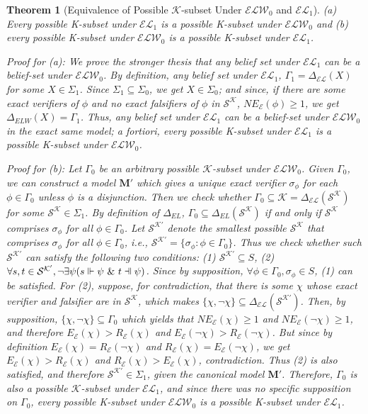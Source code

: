 \documentclass[12pt]{article}
\newtheorem{theorem}{Theorem}[section]
\newcommand{\fal}{\mathrel{\text{\reflectbox{$\Vdash$}}}}
\newcommand{\ver}{\Vdash}
\newcommand{\K}{\mathcal{K}}
\newcommand{\SK}{\mathcal{S}^\mathcal{K}}
\begin{document}
\begin{theorem}[Equivalence of Possible $\K$-subset Under $\mathcal{ELW}_{0}$ and $\mathcal{EL}_{1}$]
(a) Every possible K-subset under $\mathcal{EL}_{1}$ is a possible K-subset under $\mathcal{ELW}_{0}$ and (b) every possible K-subset under $\mathcal{ELW}_{0}$ is a possible K-subset under $\mathcal{EL}_{1}$.
\par
Proof for (a): We prove the stronger thesis that any belief set under $\mathcal{EL}_{1}$ can be a belief-set under $\mathcal{ELW}_0$. By definition, any belief set under $\mathcal{EL}_1$, $\Gamma_1 = \Delta_\mathcal{EL}(X)$ for some $X \in \Sigma_1$. Since $\Sigma_1 \subseteq \Sigma_0$, we get $X \in \Sigma_0$; and since, if there are some exact verifiers of $\phi$ and no exact falsifiers of $\phi$ in $\SK$, $NE_\mathcal{E}(\phi) \geq 1$, we get $\Delta_{ELW}(X) = \Gamma_1$. Thus, any belief set under $\mathcal{EL}_{1}$ can be a belief-set under $\mathcal{ELW}_0$ in the exact same model; a fortiori, every possible K-subset under $\mathcal{EL}_{1}$ is a possible K-subset under $\mathcal{ELW}_{0}$.
\par
Proof for (b): Let $\Gamma_0$ be an arbitrary possible $\K$-subset under $\mathcal{ELW}_0$. Given $\Gamma_0$, we can construct a model $\bm{M}'$ which gives a unique exact verifier $\sigma_\phi$ for each $\phi \in \Gamma_0$ unless $\phi$ is a disjunction. Then we check whether $\Gamma_0 \subseteq \K = \Delta_\mathcal{EL} (\SK)$ for some $\SK \in \Sigma_1$. By definition of $\Delta_{EL}$, $\Gamma_0 \subseteq \Delta_{EL} (\SK)$ if and only if $\SK$ comprises $\sigma_\phi$ for all $\phi \in \Gamma_0$. Let $\mathcal{S}^{\mathcal{K}'}$ denote the smallest possible $\SK$ that comprises $\sigma_\phi$ for all $\phi \in \Gamma_0$, i.e., $\mathcal{S}^{\mathcal{K}'} = \{\sigma_\phi: \phi \in \Gamma_0\}$. Thus we check whether such $\mathcal{S}^{\mathcal{K}'}$ can satisfy the following two conditions: (1) $\mathcal{S}^{\mathcal{K}'} \subseteq S$, (2) $\forall s, t \in \mathcal{S}^{\mathcal{K}'}, \lnot \exists \psi (s \ver \psi \ \& \ t \fal \psi)$. Since by supposition, $\forall \phi \in \Gamma_0, \sigma_\phi \in S$, (1) can be satisfied. For (2), suppose, for contradiction, that there is some $\chi$ whose exact verifier and falsifier are in $\SK$, which makes $\{\chi, \lnot \chi \} \subseteq \Delta_\mathcal{EL}(\mathcal{S}^{\mathcal{K}'})$. Then, by supposition, $\{\chi, \lnot \chi \} \subseteq \Gamma_0$ which yields that $NE_\mathcal{E} (\chi) \geq 1$ and $NE_\mathcal{E} (\lnot \chi) \geq 1$, and therefore $E_\mathcal{E}(\chi) > R_\mathcal{E}(\chi)$ and $E_\mathcal{E}(\lnot \chi) > R_\mathcal{E}(\lnot \chi)$. But since by definition $E_\mathcal{E}(\chi) = R_\mathcal{E}(\lnot \chi)$ and $R_\mathcal{E}(\chi) = E_\mathcal{E}(\lnot \chi)$, we get $E_\mathcal{E}(\chi) > R_\mathcal{E}(\chi)$ and $R_\mathcal{E}(\chi) > E_\mathcal{E}(\chi)$, contradiction. Thus (2) is also satisfied, and therefore $\mathcal{S}^{\mathcal{K}'} \in \Sigma_1$, given the canonical model $\bm{M}'$. Therefore, $\Gamma_0$ is also a possible $\K$-subset under $\mathcal{EL}_1$, and since there was no specific supposition on $\Gamma_0$, every possible K-subset under $\mathcal{ELW}_{0}$ is a possible K-subset under $\mathcal{EL}_{1}$.
\end{theorem}
\end{document}
